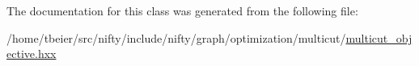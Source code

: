 The documentation for this class was generated from the following file\+:\begin{DoxyCompactItemize}
\item 
/home/tbeier/src/nifty/include/nifty/graph/optimization/multicut/\hyperlink{graph_2optimization_2multicut_2multicut__objective_8hxx}{multicut\+\_\+objective.\+hxx}\end{DoxyCompactItemize}

